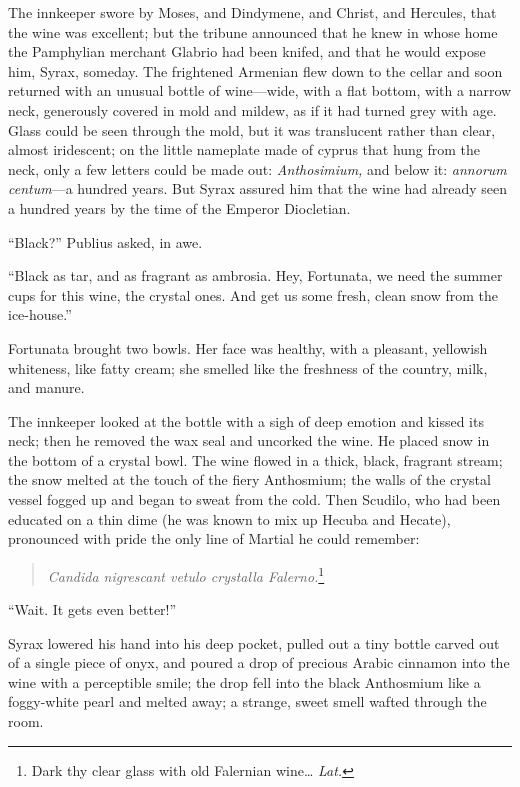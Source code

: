 The innkeeper swore by Moses, and Dindymene, and Christ, and Hercules, that the wine was excellent; but the tribune announced that he knew in whose home the Pamphylian merchant Glabrio had been knifed, and that he would expose him, Syrax, someday. The frightened Armenian flew down to the cellar and soon returned with an unusual bottle of wine---wide, with a flat bottom, with a narrow neck, generously covered in mold and mildew, as if it had turned grey with age. Glass could be seen through the mold, but it was translucent rather than clear, almost iridescent; on the little nameplate made of cyprus that hung from the neck, only a few letters could be made out: \textit{Anthosimium,} and below it: \textit{annorum centum}---a hundred years. But Syrax assured him that the wine had already seen a hundred years by the time of the Emperor Diocletian.

``Black?'' Publius asked, in awe. %

``Black as tar, and as fragrant as ambrosia. Hey, Fortunata, we need the summer cups for this wine, the crystal ones. And get us some fresh, clean snow from the ice-house.'' %

Fortunata brought two bowls. Her face was healthy, with a pleasant, yellowish whiteness, like fatty cream; she smelled like the freshness of the country, milk, and manure.

The innkeeper looked at the bottle with a sigh of deep emotion and kissed its neck; then he removed the wax seal and uncorked the wine. He placed snow in the bottom of a crystal bowl. The wine flowed in a thick, black, fragrant stream; the snow melted at the touch of the fiery Anthosmium; the walls of the crystal vessel fogged up and began to sweat from the cold. Then Scudilo, who had been educated on a thin dime (he was known to mix up Hecuba and Hecate), pronounced with pride the only line of Martial he could remember:

\begin{quote}
	{\textit{Candida nigrescant vetulo crystalla Falerno.}\footnote{Dark thy clear glass with old Falernian wine\ldots{} \textit{Lat.}}}
\end{quote}

``Wait. It gets even better!'' %

Syrax lowered his hand into his deep pocket, pulled out a tiny bottle carved out of a single piece of onyx, and poured a drop of precious Arabic cinnamon into the wine with a perceptible smile; the drop fell into the black Anthosmium like a foggy-white pearl and melted away; a strange, sweet smell wafted through the room.

